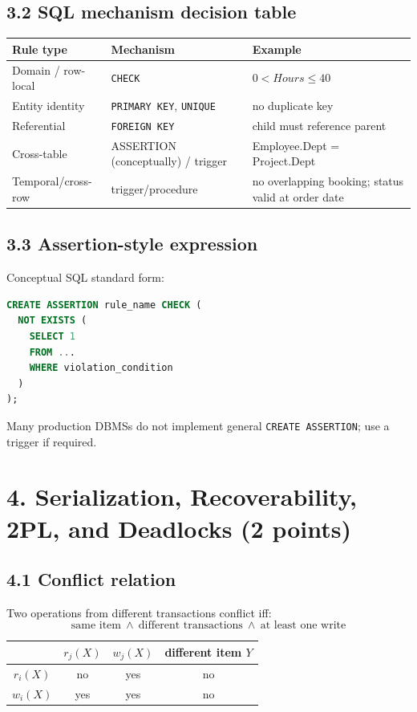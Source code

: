 \documentclass[10pt,a4paper]{article}
\begin{document}
\subsection{3.2 SQL mechanism decision table}
\begin{center}
\begin{tabularx}{\textwidth}{p{3.3cm} p{4.2cm} X}
\toprule
\textbf{Rule type} & \textbf{Mechanism} & \textbf{Example}\\
\midrule
Domain / row-local & \texttt{CHECK} & $0<Hours\le40$\\
Entity identity & \texttt{PRIMARY KEY}, \texttt{UNIQUE} & no duplicate key\\
Referential & \texttt{FOREIGN KEY} & child must reference parent\\
Cross-table & ASSERTION (conceptually) / trigger & Employee.Dept = Project.Dept\\
Temporal/cross-row & trigger/procedure & no overlapping booking; status valid at order date\\
\bottomrule
\end{tabularx}
\end{center}

\subsection{3.3 Assertion-style expression}
Conceptual SQL standard form:
\begin{lstlisting}[language=SQL]
CREATE ASSERTION rule_name CHECK (
  NOT EXISTS (
    SELECT 1
    FROM ...
    WHERE violation_condition
  )
);
\end{lstlisting}
Many production DBMSs do not implement general \texttt{CREATE ASSERTION}; use a trigger if required.

\section{4. Serialization, Recoverability, 2PL, and Deadlocks (2 points)}

\subsection{4.1 Conflict relation}
Two operations from different transactions conflict iff:
\[
\boxed{\text{same item}\ \land\ \text{different transactions}\ \land\ \text{at least one write}}
\]

\begin{center}
\begin{tabular}{c|ccc}
 & $r_j(X)$ & $w_j(X)$ & different item $Y$\\\hline
$r_i(X)$ & no & yes & no\\
$w_i(X)$ & yes & yes & no
\end{tabular}
\end{center}
\end{document}
